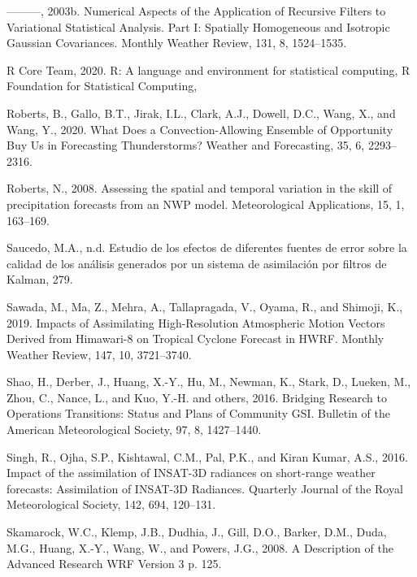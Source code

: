 \documentclass[12pt,twoside]{reedthesis}
\begin{document}
\leavevmode\hypertarget{ref-purser2003}{}%
---------, 2003b. Numerical Aspects of the Application of Recursive Filters to Variational Statistical Analysis. Part I: Spatially Homogeneous and Isotropic Gaussian Covariances. Monthly Weather Review, 131, 8, 1524--1535.

\leavevmode\hypertarget{ref-rcoreteam2020}{}%
R Core Team, 2020. R: A language and environment for statistical computing, R Foundation for Statistical Computing,

\leavevmode\hypertarget{ref-roberts2020}{}%
Roberts, B., Gallo, B.T., Jirak, I.L., Clark, A.J., Dowell, D.C., Wang, X., and Wang, Y., 2020. What Does a Convection-Allowing Ensemble of Opportunity Buy Us in Forecasting Thunderstorms? Weather and Forecasting, 35, 6, 2293--2316.

\leavevmode\hypertarget{ref-roberts2008}{}%
Roberts, N., 2008. Assessing the spatial and temporal variation in the skill of precipitation forecasts from an NWP model. Meteorological Applications, 15, 1, 163--169.

\leavevmode\hypertarget{ref-saucedo}{}%
Saucedo, M.A., n.d. Estudio de los efectos de diferentes fuentes de error sobre la calidad de los análisis generados por un sistema de asimilación por filtros de Kalman, 279.

\leavevmode\hypertarget{ref-sawada2019}{}%
Sawada, M., Ma, Z., Mehra, A., Tallapragada, V., Oyama, R., and Shimoji, K., 2019. Impacts of Assimilating High-Resolution Atmospheric Motion Vectors Derived from Himawari-8 on Tropical Cyclone Forecast in HWRF. Monthly Weather Review, 147, 10, 3721--3740.

\leavevmode\hypertarget{ref-shao2016}{}%
Shao, H., Derber, J., Huang, X.-Y., Hu, M., Newman, K., Stark, D., Lueken, M., Zhou, C., Nance, L., and Kuo, Y.-H. and others, 2016. Bridging Research to Operations Transitions: Status and Plans of Community GSI. Bulletin of the American Meteorological Society, 97, 8, 1427--1440.

\leavevmode\hypertarget{ref-singh2016}{}%
Singh, R., Ojha, S.P., Kishtawal, C.M., Pal, P.K., and Kiran Kumar, A.S., 2016. Impact of the assimilation of INSAT-3D radiances on short-range weather forecasts: Assimilation of INSAT-3D Radiances. Quarterly Journal of the Royal Meteorological Society, 142, 694, 120--131.

\leavevmode\hypertarget{ref-skamarock2008}{}%
Skamarock, W.C., Klemp, J.B., Dudhia, J., Gill, D.O., Barker, D.M., Duda, M.G., Huang, X.-Y., Wang, W., and Powers, J.G., 2008. A Description of the Advanced Research WRF Version 3 p. 125.
\end{document}
